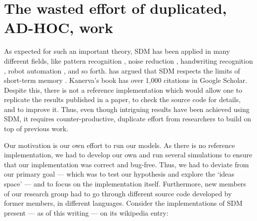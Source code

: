 \section{The wasted effort of duplicated, AD-HOC, work}

As expected for such an important theory, SDM has been applied in many different fields, like pattern recognition \citep{norman2003modeling, rao1995natural}, noise reduction \citep{Meng2009}, handwriting recognition \citep{fan1997genetic}, robot automation \citep{Rajesh1998, mendes2008robot}, and so forth. \citet{Linhares2011} has argued that SDM respects the limits of short-term memory \citep{Miller1955, Cowan2001}. Kanerva's book has over 1,000 citations in Google Scholar.  Despite this, there is not a reference implementation which would allow one to replicate the results published in a paper, to check the source code for details, and to improve it. Thus, even though intriguing results have been achieved using SDM, it requires counter-productive, duplicate effort from researchers to build on top of previous work.

Our motivation is our own effort to run our models. As there is no reference implementation, we had to develop our own and run several simulations to ensure that our implementation was correct and bug-free. Thus, we had to deviate from our primary goal --- which was to test our hypothesis and explore the `ideas space' --- and to focus on the implementation itself. Furthermore, new members of our research group had to go through different source code developed by former members, in different languages.  Consider the implementations of SDM present --- as of this writing --- on its wikipedia entry\citep{noauthor_sparse_2018}:

